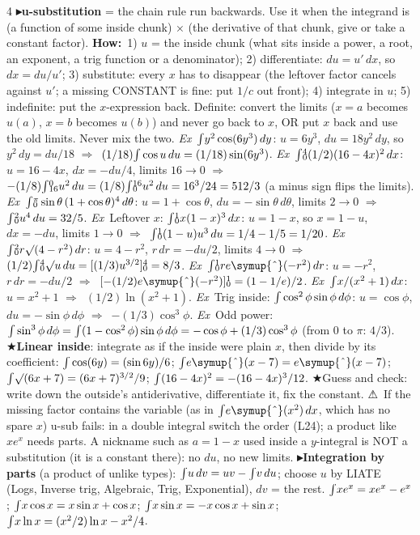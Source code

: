 \documentclass{article}
\newcommand\supy[1]{\sp{\smash{\lower0.02em\hbox{$\scriptstyle#1$}}}}    %
\newcommand\suby[1]{\sb{\smash{\raise0.10em\hbox{$\scriptstyle#1$}}}}    %
\newcommand\cx{\mathord{\symup{\char"5E}}}                               %
\newcommand\I[2]{{\smash{\int}}\suby{#1}\supy{#2}}                        %
\newcommand\J{{\smash{\int}}}                                             %
\newcommand\ev[2]{\suby{#1}\supy{#2}}                                     %
\newcommand\pt[1]{\textbf{{\symf ▸}#1}}       %
\newcommand\ex{\textit{Ex}\ }                  %
\newcommand\how{\textbf{How:}\ }
\newcommand\warn{{\symf ⚠}}                    %
\newcommand\shc{{\symf ★}}                      %
\newcommand\rt{\smash{\surd}}                  %
\newcommand\then{\ensuremath{\Rightarrow}}
\begin{document}
\begin{multicols*}{4}
\pt{u-substitution} = the chain rule run backwards. Use it when the integrand is (a function of some inside chunk) × (the derivative of that chunk, give or take a constant factor). \how 1) $u$ = the inside chunk (what sits inside a power, a root, an exponent, a trig function or a denominator); 2) differentiate: $du=u'\,dx$, so $dx=du/u'$; 3) substitute: every $x$ has to disappear (the leftover factor cancels against $u'$; a missing CONSTANT is fine: put $1/c$ out front); 4) integrate in $u$; 5) indefinite: put the $x$-expression back. Definite: convert the limits ($x=a$ becomes $u(a)$, $x=b$ becomes $u(b)$) and never go back to $x$, OR put $x$ back and use the old limits. Never mix the two. \ex $\J y^2\cos(6y^3)\,dy$: $u=6y^3$, $du=18y^2\,dy$, so $y^2\,dy=du/18$ \then\ $(1/18)\J\cos u\,du=(1/18)\sin(6y^3)$. \ex $\I{0}{4}(1/2)(16-4x)^2\,dx$: $u=16-4x$, $dx=-du/4$, limits $16\to0$ \then\ $-(1/8)\I{16}{0}u^2\,du=(1/8)\I{0}{16}u^2\,du=16^3/24=512/3$ (a minus sign flips the limits). \ex $\I{0}{\pi}\sin\theta\,(1+\cos\theta)^4\,d\theta$: $u=1+\cos\theta$, $du=-\sin\theta\,d\theta$, limits $2\to0$ \then\ $\I{0}{2}u^4\,du=32/5$. \ex Leftover $x$: $\I{0}{1}x(1-x)^3\,dx$: $u=1-x$, so $x=1-u$, $dx=-du$, limits $1\to0$ \then\ $\I{0}{1}(1-u)u^3\,du=1/4-1/5=1/20$. \ex $\I{0}{2}r\rt(4-r^2)\,dr$: $u=4-r^2$, $r\,dr=-du/2$, limits $4\to0$ \then\ $(1/2)\I{0}{4}\rt u\,du=[(1/3)u^{3/2}]\ev{0}{4}=8/3$. \ex $\I{0}{1}re\cx(-r^2)\,dr$: $u=-r^2$, $r\,dr=-du/2$ \then\ $[-(1/2)e\cx(-r^2)]\ev{0}{1}=(1-1/e)/2$. \ex $\J x/(x^2+1)\,dx$: $u=x^2+1$ \then\ $(1/2)\ln(x^2+1)$. \ex Trig inside: $\J\cos^2\phi\sin\phi\,d\phi$: $u=\cos\phi$, $du=-\sin\phi\,d\phi$ \then\ $-(1/3)\cos^3\phi$. \ex Odd power: $\J\sin^3\phi\,d\phi=\J(1-\cos^2\phi)\sin\phi\,d\phi=-\cos\phi+(1/3)\cos^3\phi$ (from 0 to $\pi$: $4/3$). \shc \textbf{Linear inside}: integrate as if the inside were plain $x$, then divide by its coefficient: $\J\cos(6y)=(\sin6y)/6$; $\J e\cx(x-7)=e\cx(x-7)$; $\J\rt(6x+7)=(6x+7)^{3/2}/9$; $\J(16-4x)^2=-(16-4x)^3/12$. \shc Guess and check: write down the outside's antiderivative, differentiate it, fix the constant. \warn\ If the missing factor contains the variable (as in $\J e\cx(x^2)\,dx$, which has no spare $x$) u-sub fails: in a double integral switch the order (L24); a product like $xe^x$ needs parts. A nickname such as $a=1-x$ used inside a $y$-integral is NOT a substitution (it is a constant there): no $du$, no new limits.
\pt{Integration by parts} (a product of unlike types): $\J u\,dv=uv-\J v\,du$; choose $u$ by LIATE (Logs, Inverse trig, Algebraic, Trig, Exponential), $dv$ = the rest. $\J xe^x=xe^x-e^x$; $\J x\cos x=x\sin x+\cos x$; $\J x\sin x=-x\cos x+\sin x$; $\J x\ln x=(x^2/2)\ln x-x^2/4$.

\end{multicols*}
\end{document}
